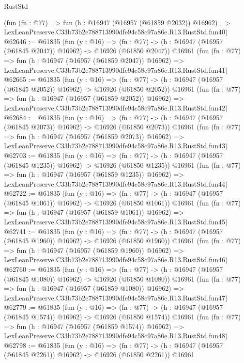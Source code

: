 \begin{lexlean}{RustStd}
\begin{coremodule}
    (fun (fn : @77) =>
    fun (h : @16947 (@16957 (@61859 @2032)) @16962) =>
    LexLeanPreserve.C33b73b2e788713990dfe94c58c97a86e.R13.RustStd.fun40)
@62646 := @61835
    (fun (y : @16) =>
    (fn : @77) -> (h : @16947 (@16957 (@61845 @2047)) @16962) -> @16926 (@61850 @2047))
    @16961
    (fun (fn : @77) =>
    fun (h : @16947 (@16957 (@61859 @2047)) @16962) =>
    LexLeanPreserve.C33b73b2e788713990dfe94c58c97a86e.R13.RustStd.fun41)
@62665 := @61835
    (fun (y : @16) =>
    (fn : @77) -> (h : @16947 (@16957 (@61845 @2052)) @16962) -> @16926 (@61850 @2052))
    @16961
    (fun (fn : @77) =>
    fun (h : @16947 (@16957 (@61859 @2052)) @16962) =>
    LexLeanPreserve.C33b73b2e788713990dfe94c58c97a86e.R13.RustStd.fun42)
@62684 := @61835
    (fun (y : @16) =>
    (fn : @77) -> (h : @16947 (@16957 (@61845 @2073)) @16962) -> @16926 (@61850 @2073))
    @16961
    (fun (fn : @77) =>
    fun (h : @16947 (@16957 (@61859 @2073)) @16962) =>
    LexLeanPreserve.C33b73b2e788713990dfe94c58c97a86e.R13.RustStd.fun43)
@62703 := @61835
    (fun (y : @16) =>
    (fn : @77) -> (h : @16947 (@16957 (@61845 @1235)) @16962) -> @16926 (@61850 @1235))
    @16961
    (fun (fn : @77) =>
    fun (h : @16947 (@16957 (@61859 @1235)) @16962) =>
    LexLeanPreserve.C33b73b2e788713990dfe94c58c97a86e.R13.RustStd.fun44)
@62722 := @61835
    (fun (y : @16) =>
    (fn : @77) -> (h : @16947 (@16957 (@61845 @1061)) @16962) -> @16926 (@61850 @1061))
    @16961
    (fun (fn : @77) =>
    fun (h : @16947 (@16957 (@61859 @1061)) @16962) =>
    LexLeanPreserve.C33b73b2e788713990dfe94c58c97a86e.R13.RustStd.fun45)
@62741 := @61835
    (fun (y : @16) =>
    (fn : @77) -> (h : @16947 (@16957 (@61845 @1960)) @16962) -> @16926 (@61850 @1960))
    @16961
    (fun (fn : @77) =>
    fun (h : @16947 (@16957 (@61859 @1960)) @16962) =>
    LexLeanPreserve.C33b73b2e788713990dfe94c58c97a86e.R13.RustStd.fun46)
@62760 := @61835
    (fun (y : @16) =>
    (fn : @77) -> (h : @16947 (@16957 (@61845 @1080)) @16962) -> @16926 (@61850 @1080))
    @16961
    (fun (fn : @77) =>
    fun (h : @16947 (@16957 (@61859 @1080)) @16962) =>
    LexLeanPreserve.C33b73b2e788713990dfe94c58c97a86e.R13.RustStd.fun47)
@62779 := @61835
    (fun (y : @16) =>
    (fn : @77) -> (h : @16947 (@16957 (@61845 @1574)) @16962) -> @16926 (@61850 @1574))
    @16961
    (fun (fn : @77) =>
    fun (h : @16947 (@16957 (@61859 @1574)) @16962) =>
    LexLeanPreserve.C33b73b2e788713990dfe94c58c97a86e.R13.RustStd.fun48)
@62798 := @61835
    (fun (y : @16) =>
    (fn : @77) -> (h : @16947 (@16957 (@61845 @2261)) @16962) -> @16926 (@61850 @2261))
    @16961

\end{coremodule}
\end{lexlean}
